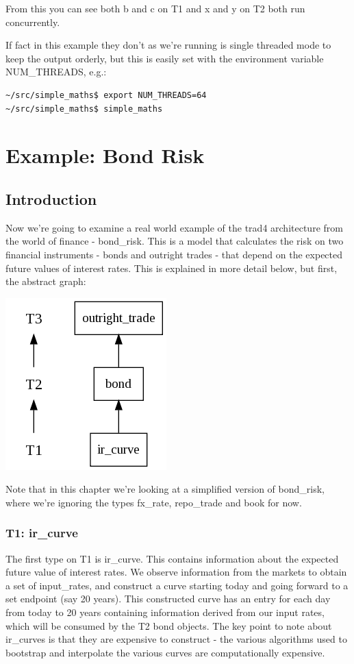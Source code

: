 \documentclass{report}
\begin{document}
From this you can see both b and c on T1 and x and y on T2 both run concurrently. 

If fact in this example they don't as we're running is single threaded mode to keep the output orderly, but this is easily set with the environment variable NUM_THREADS, e.g.:

\begin{verbatim}
~/src/simple_maths$ export NUM_THREADS=64
~/src/simple_maths$ simple_maths
\end{verbatim}

\chapter{Example: Bond Risk}

\section{Introduction}

Now we're going to examine a real world example of the trad4 architecture from the world of finance - bond_risk. This is a model that calculates the risk on two financial instruments - bonds and outright trades - that depend on the expected future values of interest rates. This is explained in more detail below, but first, the abstract graph:

\includegraphics[scale=0.5]{bondriskabstract1.png}

Note that in this chapter we're looking at a simplified version of bond_risk, where we're ignoring the types fx_rate, repo_trade and book for now.

\subsection{T1: ir_curve}

The first type on T1 is ir_curve. This contains information about the expected future value of interest rates. We observe information from the markets to obtain a set of input_rates, and construct a curve starting today and going forward to a set endpoint (say 20 years). This constructed curve has an entry for each day from today to 20 years containing information derived from our input rates, which will be consumed by the T2 bond objects. The key point to note about ir_curves is that they are expensive to construct - the various algorithms used to bootstrap and interpolate the various curves are computationally expensive.
\end{document}
